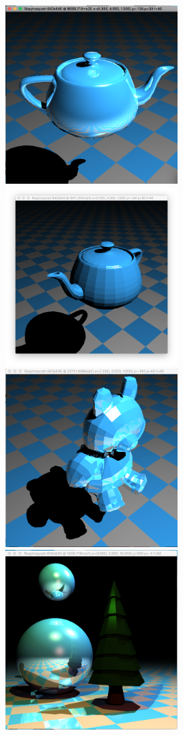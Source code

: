 \includegraphics[width=0.5\textwidth]{img/smoothTeapot2}
\includegraphics[width=0.5\textwidth]{img/solidTeapot}
\includegraphics[width=0.5\textwidth]{img/teddy}
\includegraphics[width=0.5\textwidth]{img/treeSpheres}
